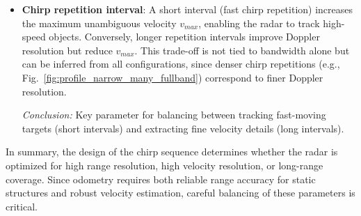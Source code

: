 \begin{itemize}
    \vspace{1em} 
    \item \textbf{Chirp repetition interval}:  
    A short interval (fast chirp repetition) increases the maximum unambiguous velocity $v_{max}$, enabling the radar to track high-speed objects.  
    Conversely, longer repetition intervals improve Doppler resolution but reduce $v_{max}$.  
    This trade-off is not tied to bandwidth alone but can be inferred from all configurations, since denser chirp repetitions (e.g., Fig.~\ref{fig:profile_narrow_many_fullband}) correspond to finer Doppler resolution.

    {\small
    \textit{Conclusion:}  
    Key parameter for balancing between tracking fast-moving targets (short intervals) and extracting fine velocity details (long intervals).
    }
    \vspace{1em} 
\end{itemize}



In summary, the design of the chirp sequence determines whether the radar is optimized for high range resolution, high velocity resolution, or long-range coverage.  
Since odometry requires both reliable range accuracy for static structures and robust velocity estimation, careful balancing of these parameters is critical.  

\FloatBarrier